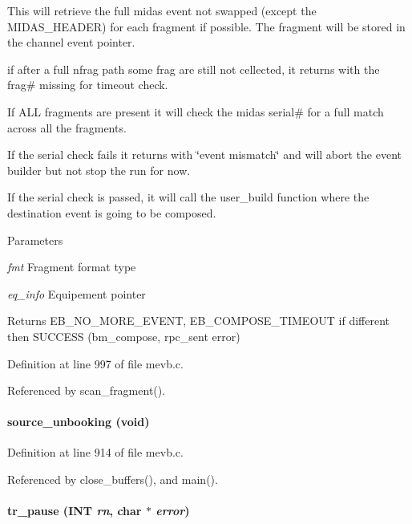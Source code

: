 \begin{DoxyEnumerate}
\item This will retrieve the full midas event not swapped (except the MIDAS\_\-HEADER) for each fragment if possible. The fragment will be stored in the channel event pointer.
\item if after a full nfrag path some frag are still not cellected, it returns with the frag\# missing for timeout check.
\item If ALL fragments are present it will check the midas serial\# for a full match across all the fragments.
\item If the serial check fails it returns with \char`\"{}event mismatch\char`\"{} and will abort the event builder but not stop the run for now.
\item If the serial check is passed, it will call the user\_\-build function where the destination event is going to be composed.
\end{DoxyEnumerate}


\begin{DoxyParams}{Parameters}
\item[{\em fmt}]Fragment format type \item[{\em eq\_\-info}]Equipement pointer \end{DoxyParams}
\begin{DoxyReturn}{Returns}
EB\_\-NO\_\-MORE\_\-EVENT, EB\_\-COMPOSE\_\-TIMEOUT if different then SUCCESS (bm\_\-compose, rpc\_\-sent error) 
\end{DoxyReturn}


Definition at line 997 of file mevb.c.

Referenced by scan\_\-fragment().
\paragraph[{source\_\-unbooking}]{ source\_\-unbooking (void)}\hfill\label{mevb_8c_a74e27fd802209a7c0cb777a1bd841ca5}


Definition at line 914 of file mevb.c.

Referenced by close\_\-buffers(), and main().
\paragraph[{tr\_\-pause}]{ tr\_\-pause ({\bf INT} {\em rn}, \/  char $\ast$ {\em error})}\hfill\label{mevb_8c_a7b3b6a2f570d0b31b1ad13c34536db5a}


